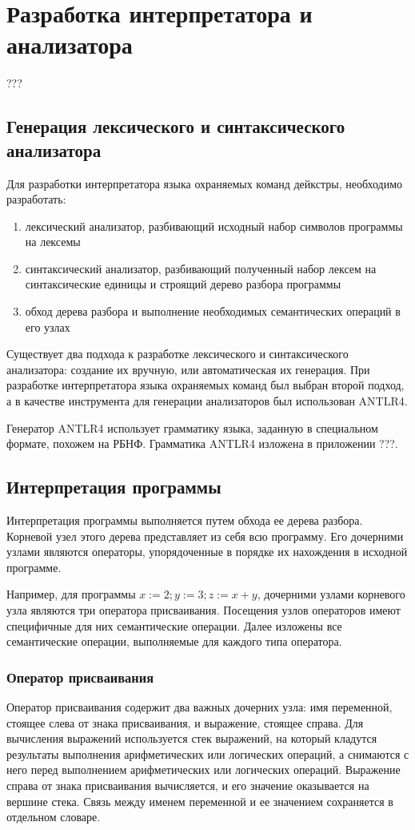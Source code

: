 \chapter{Разработка интерпретатора и анализатора} \label{ch3}

???

\section{Генерация лексического и синтаксического анализатора}
Для разработки интерпретатора языка охраняемых команд дейкстры, необходимо разработать:
\begin{enumerate}
    \item лексический анализатор, разбивающий исходный набор символов программы на лексемы
    \item синтаксический анализатор, разбивающий полученный набор лексем на синтаксические единицы и строящий
    дерево разбора программы
    \item обход дерева разбора и выполнение необходимых семантических операций в его узлах
\end{enumerate}

Существует два подхода к разработке лексического и синтаксического анализатора: создание их вручную,
или автоматическая их генерация. При разработке интерпретатора языка охраняемых команд был выбран второй подход,
а в качестве инструмента для генерации анализаторов был использован ANTLR4.

Генератор ANTLR4 использует грамматику языка, заданную в специальном формате, похожем на РБНФ.
Грамматика ANTLR4 изложена в приложении ???. 

\section{Интерпретация программы}
Интерпретация программы выполняется путем обхода ее дерева разбора. Корневой узел этого дерева
представляет из себя всю программу. Его дочерними узлами являются операторы, упорядоченные 
в порядке их нахождения в исходной программе.

Например, для программы $x := 2; y := 3; z := x + y$, 
дочерними узлами корневого узла являются три оператора присваивания.
Посещения узлов операторов имеют специфичные для них семантические операции. Далее изложены все семантические операции,
выполняемые для каждого типа оператора.

\subsection{Оператор присваивания}
Оператор присваивания содержит два важных дочерних узла: имя переменной, стоящее слева от знака присваивания,
и выражение, стоящее справа. Для вычисления выражений используется стек выражений, на который кладутся результаты
выполнения арифметических или логических операций, а снимаются с него перед выполнением арифметических или логических операций.
Выражение справа от знака присваивания вычисляется, и его значение оказывается на вершине стека.
Связь между именем переменной и ее значением сохраняется в отдельном словаре.


